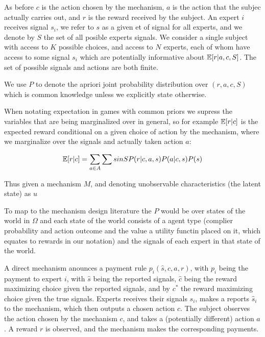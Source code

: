 As before $c$ is the action chosen by the mechanism, $a$ is the action that the subjec actually carries out, and $r$ is the reward received by the subject. An expert $i$ receives signal $s_i$, we refer to $s$ as a given et of signal for all experts, and we denote by $S$ the set of all posible experts signals.
We consider a single subject with access to $K$ possible choices, and access to  $N$ experts, each of whom have access to some signal $s_i$ which are potentially informative about $\operatorname*{\mathbb E}[r|a,c,S]$. The set of possible signals and actions are both finite.


We use $P$ to denote the apriori joint probability distribution over $(r,a,c,S) $ which is common knowledge unless we explicitly state otherwise.  

When notating expectation in games with common priors we supress the variables that are being marginalized over in general, so for example $\operatorname*{\mathbb E}[r|c]$ is the expected reward conditional on a given choice of action by the mechanism, where we  marginalize over the signals and actually taken action $a$:


\[
\operatorname*{\mathbb E}[r|c] = \sum_{a \in A} \sum{s in S} P(r|c,a,s) P(a|c,s) P(s)
\]

Thus given a mechanism $M$, and denoting unobservable characteristics (the latent state) as $u$



%	


To map to the mechanism design literature the $P$ would be over states of the world in $\Omega$ and each state of the world consists of a agent type (complier probability and action outcome and the value a utility functin placed on it, which equates to rewards in our notation) and the signals of each expert in that state of the world.

A direct mechanism anounces a payment rule $p_i(\hat{s}, c,a,r)$, with $p_i$ being the payment to expert $i$, with $\hat{s}$ being the reported signals, $\hat{c}$ being the reward maximizing choice given the reported signals, and by $c^{*}$ the reward maximizing choice given the true signals.
Experts receives their signals $s_i$, makes a reports $\hat{s}_i$ to the mechanism, which then outputs a chosen action $c$.
The subject observes the action chosen by the mechanism $c$, and takes a (potentially different) action $a$. A reward $r$ is observed, and the mechanism makes the corresponding payments.

